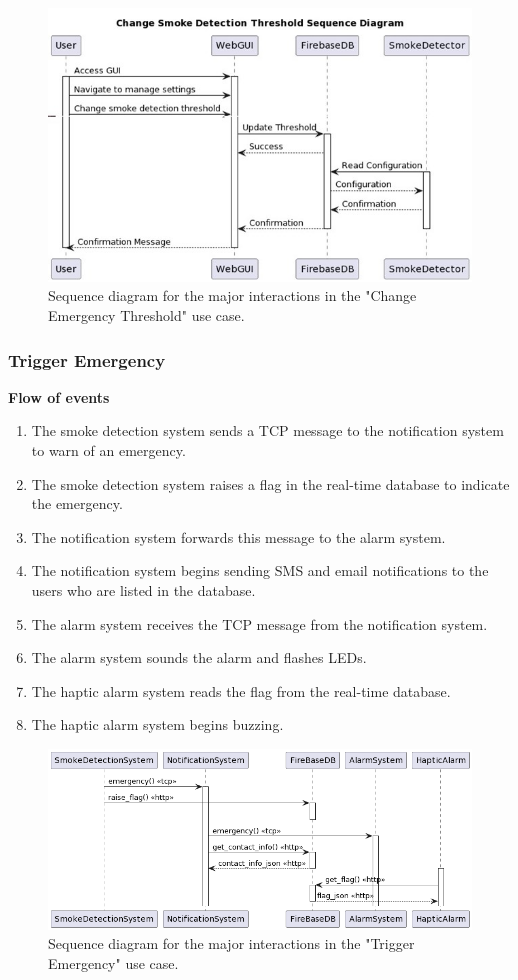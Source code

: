 \begin{figure}[H]
    \centering
    \includegraphics[width=\linewidth]{../assets/ChangeSmokeDetection.jpg}
    \caption{Sequence diagram for the major interactions in the "Change Emergency Threshold" use case.}
\end{figure}

\subsubsection{Trigger Emergency}

\textbf{Flow of events}
\begin{enumerate}
    \item The smoke detection system sends a TCP message to the notification system to warn of an emergency.
    \item The smoke detection system raises a flag in the real-time database to indicate the emergency.
    \item The notification system forwards this message to the alarm system.
    \item The notification system begins sending SMS and email notifications to the users who are listed in the database.
    \item The alarm system receives the TCP message from the notification system.
    \item The alarm system sounds the alarm and flashes LEDs.
    \item The haptic alarm system reads the flag from the real-time database.
    \item The haptic alarm system begins buzzing.
\end{enumerate}

\begin{figure}[H]
    \centering
    \includegraphics[width=\linewidth]{../assets/FANSAlarmUseCaseSequence.png}
    \caption{Sequence diagram for the major interactions in the "Trigger Emergency" use case.}
\end{figure}
